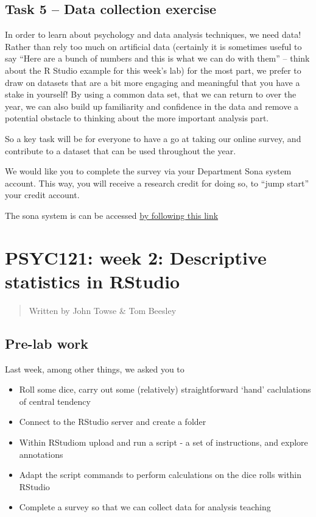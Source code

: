 \documentclass[
]{book}
\providecommand{\tightlist}{%
  \setlength{\itemsep}{0pt}\setlength{\parskip}{0pt}}
\begin{document}
\hypertarget{task-5-data-collection-exercise}{%
\section{Task 5 -- Data collection exercise}\label{task-5-data-collection-exercise}}

In order to learn about psychology and data analysis techniques, we need data! Rather than rely too much on artificial data (certainly it is sometimes useful to say ``Here are a bunch of numbers and this is what we can do with them'' -- think about the R Studio example for this week's lab) for the most part, we prefer to draw on datasets that are a bit more engaging and meaningful that you have a stake in yourself! By using a common data set, that we can return to over the year, we can also build up familiarity and confidence in the data and remove a potential obstacle to thinking about the more important analysis part.

So a key task will be for everyone to have a go at taking our online survey, and contribute to a dataset that can be used throughout the year.

We would like you to complete the survey via your Department Sona system account. This way, you will receive a research credit for doing so, to ``jump start'' your credit account.

The sona system is can be accessed \href{https://lancs.sona-systems.com}{by following this link}

\hypertarget{psyc121-week-2-descriptive-statistics-in-rstudio}{%
\chapter{PSYC121: week 2: Descriptive statistics in RStudio}\label{psyc121-week-2-descriptive-statistics-in-rstudio}}

\begin{quote}
Written by John Towse \& Tom Beesley
\end{quote}

\hypertarget{pre-lab-work}{%
\section{Pre-lab work}\label{pre-lab-work}}

Last week, among other things, we asked you to

\begin{itemize}
\tightlist
\item
  Roll some dice, carry out some (relatively) straightforward `hand' caclulations of central tendency
\item
  Connect to the RStudio server and create a folder
\item
  Within RStudiom upload and run a script - a set of instructions, and explore annotations
\item
  Adapt the script commands to perform calculations on the dice rolls within RStudio
\item
  Complete a survey so that we can collect data for analysis teaching
\end{itemize}
\end{document}

